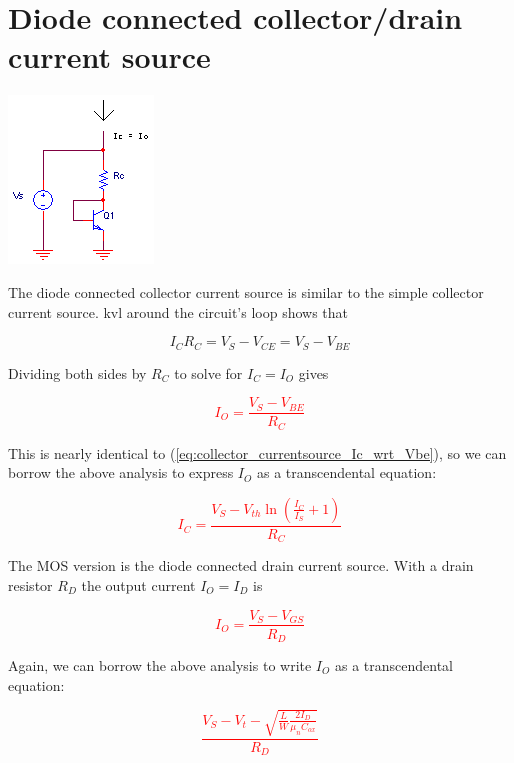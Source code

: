 \section{Diode connected collector/drain current source}
\begin{center}
	\includegraphics{schematics/diodeconnected_collector_currentsource.PNG}
\end{center}
The diode connected collector current source is similar to the simple collector current source.
\ac{kvl} around the circuit's loop shows that

\begin{equation}
I_{C}R_{C} = V_{S} - V_{CE} = V_{S} - V_{BE}
\end{equation}

Dividing both sides by $R_{C}$ to solve for $I_{C} = I_{O}$ gives

\textcolor{red}{
\begin{equation}
I_{O} = \frac{V_{S}-V_{BE}}{R_{C}}
\end{equation}
}

This is nearly identical to (\ref{eq:collector_currentsource_Ic_wrt_Vbe}), so we can borrow the above analysis to express $I_{O}$ as a transcendental equation:

\textcolor{red}{
\begin{equation}
I_{C} = \frac{V_{S}-V_{th}\ln\left(\frac{I_{C}}{I_{S}}+1\right)}{R_{C}}
\end{equation}
}

The MOS version is the diode connected drain current source. With a drain resistor $R_{D}$ the output current $I_{O} = I_{D}$ is

\textcolor{red}{
\begin{equation}
I_{O} = \frac{V_{S}-V_{GS}}{R_{D}}
\end{equation}
}

Again, we can borrow the above analysis to write $I_{O}$ as a transcendental equation:

\textcolor{red}{
\begin{equation}
\frac{V_{S}-V_{t}-\sqrt{\frac{L}{W}\frac{2I_{D}}{\mu_{n}C_{ox}}}}{R_{D}}
\end{equation}
}

